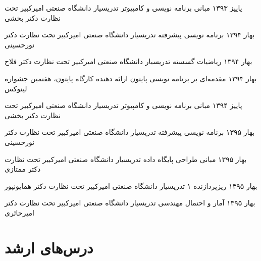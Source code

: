 \documentclass[]{friggeri-cv-fa} %
\begin{document}
\begin{entrylist}

\entry
{پاییز ۱۳۹۳}
{مبانی برنامه نویسی و کامپیوتر}
{تدریسیار}
{دانشگاه صنعتی امیرکبیر تحت نظارت دکتر بخشی}


\entry
{بهار ۱۳۹۴}
{برنامه نویسی پیشرفته}
{تدریسیار}
{دانشگاه صنعتی امیرکبیر تحت نظارت دکتر نورحسینی}


\entry
{بهار ۱۳۹۴}
{ریاضیات گسسته}
{تدریسیار}
{دانشگاه صنعتی امیرکبیر تحت نظارت دکتر فلاح}


\entry
{بهار ۱۳۹۴}
{مقدمه‌ای بر برنامه نویسی پایتون}
{ارائه دهنده}
{کارگاه پایتون، هفتمین جشواره لینوکس}


\entry
{پاییز ۱۳۹۴}
{مبانی برنامه نویسی و کامپیوتر}
{تدریسیار}
{دانشگاه صنعتی امیرکبیر تحت نظارت دکتر بخشی}


\entry
{بهار ۱۳۹۵}
{برنامه نویسی پیشرفته}
{تدریسیار}
{دانشگاه صنعتی امیرکبیر تحت نظارت دکتر نورحسینی}


\entry
{بهار ۱۳۹۵}
{مبانی طراحی پایگاه داده}
{تدریسیار}
{دانشگاه صنعتی امیرکبیر تحت نظارت دکتر ممتازی}


\entry
{بهار ۱۳۹۵}
{ریزپردازنده ۱}
{تدریسیار}
{دانشگاه صنعتی امیرکبیر تحت نظارت دکتر همایونپور}


\entry
{بهار ۱۳۹۵}
{آمار و احتمال مهندسی}
{تدریسیار}
{دانشگاه صنعتی امیرکبیر تحت نظارت دکتر امیرحائری}



\end{entrylist}


\section{درس‌های ارشد}
\end{document}
